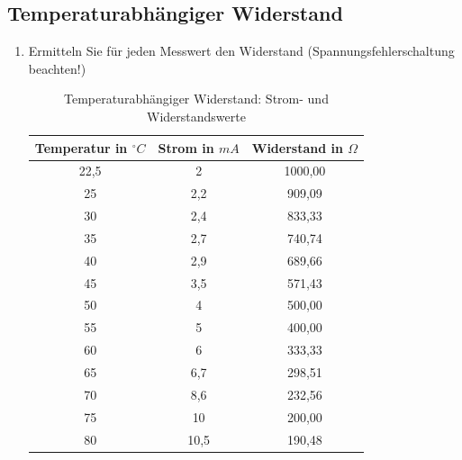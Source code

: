 \subsection{Temperaturabhängiger Widerstand}
\begin{enumerate}[label=\alph*)]
	\item Ermitteln Sie für jeden Messwert den Widerstand (Spannungsfehlerschaltung beachten!)
	      \begin{table}[h!]
		      \caption{Temperaturabhängiger Widerstand: Strom- und Widerstandswerte}
		      \begin{center}
			      \begin{tabular}[c]{c|c|c}
				      \hline
				      \multicolumn{1}{c|}{\textbf{Temperatur in $^\circ C$}} &
				      \multicolumn{1}{c|}{\textbf{Strom in $mA$}}            &
				      \multicolumn{1}{c}{\textbf{Widerstand in $\Omega$}}                     \\
				      \hline
				      22,5                                                   & 2    & 1000,00 \\
				      25                                                     & 2,2  & 909,09  \\
				      30                                                     & 2,4  & 833,33  \\
				      35                                                     & 2,7  & 740,74  \\
				      40                                                     & 2,9  & 689,66  \\
				      45                                                     & 3,5  & 571,43  \\
				      50                                                     & 4    & 500,00  \\
				      55                                                     & 5    & 400,00  \\
				      60                                                     & 6    & 333,33  \\
				      65                                                     & 6,7  & 298,51  \\
				      70                                                     & 8,6  & 232,56  \\
				      75                                                     & 10   & 200,00  \\
				      80                                                     & 10,5 & 190,48  \\

\end{tabular}
\end{center}
\end{table}
\end{enumerate}
